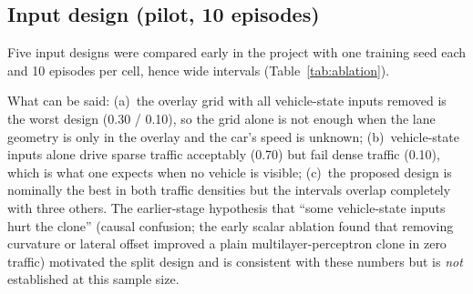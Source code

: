 \subsection{Input design (pilot, 10 episodes)}
Five input designs were compared early in the project with one training seed each and 10 episodes per cell, hence wide intervals (Table~\ref{tab:ablation}).
\begin{table}[H]\centering\small
\caption{Input-design ablation, seeds 1000--1009 (10 episodes per cell). Intervals are 95\% Wilson intervals and are very wide.}\label{tab:ablation}
\resizebox{\textwidth}{!}{}
\end{table}
What can be said: (a)~the overlay grid with all vehicle-state inputs removed is the worst design (0.30 / 0.10), so the grid alone is not enough when the lane geometry is only in the overlay and the car's speed is unknown;
(b)~vehicle-state inputs alone drive sparse traffic acceptably (0.70) but fail dense traffic (0.10), which is what one expects when no vehicle is visible; (c)~the proposed design is nominally the best in both traffic densities but the intervals overlap completely with three others.
The earlier-stage hypothesis that ``some vehicle-state inputs hurt the clone'' (causal confusion; the early scalar ablation found that removing curvature or lateral offset improved a plain multilayer-perceptron clone in zero traffic) motivated the split design and is consistent with these numbers but is \emph{not} established at this sample size.

